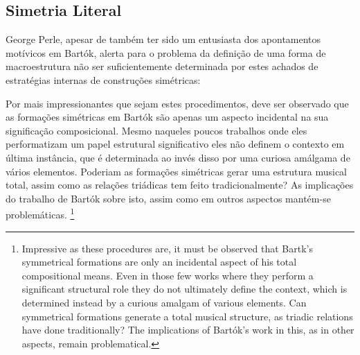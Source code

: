 \documentclass[
	12pt,				%
	openright,			%
	twoside,			%
	a4paper,			%
	english,			%
	french,				%
	spanish,			%
	brazil				%
	]{abntex2}
\begin{document}
%



\subsection{Simetria Literal}
\label{simetrialiteral}


George Perle, apesar de também ter sido um entusiasta dos apontamentos motívicos em Bartók, alerta para o problema da definição de uma forma de macroestrutura não ser suficientemente determinada por estes achados de estratégias internas de construções simétricas:

\begin{citacao}
Por mais impressionantes que sejam estes procedimentos, deve ser observado que as formações simétricas em Bartók são apenas um aspecto incidental na sua significação composicional. Mesmo naqueles poucos trabalhos onde eles performatizam um papel estrutural significativo eles não definem o contexto em última instância, que é determinada ao invés disso por uma curiosa amálgama de vários elementos.
Poderiam as formações simétricas gerar uma estrutura musical total, assim como as relações triádicas tem feito tradicionalmente? As implicações do trabalho de Bartók sobre isto, assim como em outros aspectos mantém-se problemáticas. \cite[p. 300-312]{perle1955symmetrical} \footnote{Impressive as these procedures are, it must be observed that Bartk's symmetrical formations are only an incidental aspect of his total compositional means. Even in those few works where they perform a significant structural role they do not ultimately define the context, which is determined instead by a curious amalgam of various elements. Can symmetrical formations generate a total musical structure, as triadic relations have done traditionally? The implications of Bartók's work in this, as in other aspects, remain problematical.\cite[p. 300-312]{perle1955symmetrical}}
\end{citacao}
\end{document}
